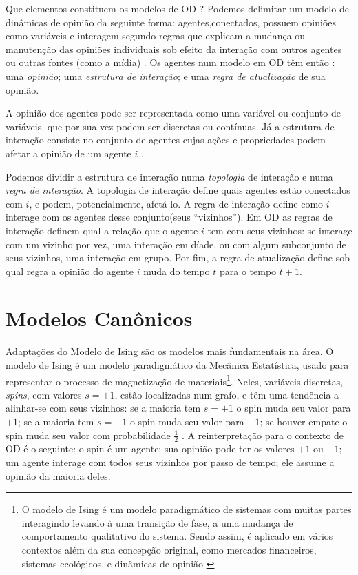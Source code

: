   Que elementos constituem os modelos de OD ? Podemos delimitar um modelo de
  dinâmicas de opinião da seguinte forma: agentes,conectados, possuem opiniões
  como variáveis e interagem segundo regras que explicam a mudança ou manutenção
  das opiniões individuais sob efeito da interação com outros agentes ou outras
  fontes (como a mídia) \cite{sirbu2017opinion}. Os agentes num modelo em OD têm
  então : uma \textit{opinião}; uma \textit{estrutura de interação}; e uma
  \textit{regra de atualização} de sua opinião.


  A opinião dos agentes pode ser representada como uma variável ou conjunto de
  variáveis, que por sua vez podem ser discretas ou contínuas. Já a estrutura de
  interação consiste no conjunto de agentes cujas ações e propriedades podem
  afetar a opinião de um agente \(i\) \cite{page2008uncertainty}.

  Podemos dividir a estrutura de interação numa \textit{topologia} de interação e
  numa \textit{regra de interação}. A topologia de interação define quais
  agentes estão conectados com \(i\), e podem, potencialmente, afetá-lo. A regra
  de interação define como \(i\) interage com os agentes desse conjunto(seus
  ``vizinhos''). Em OD as regras de interação definem qual a
  relação que o agente \(i\) tem com seus vizinhos: se interage com um vizinho
  por vez, uma interação em díade, ou com algum subconjunto de seus vizinhos,
  uma interação em grupo. Por fim, a regra de atualização define sob qual regra
  a opinião do agente \(i\) muda do tempo \(t\) para o tempo \(t+1\). 

  

  \section{Modelos Canônicos}

  Adaptações do Modelo de Ising são os modelos mais fundamentais na área. O
  modelo de Ising é um modelo paradigmático da Mecânica Estatística, usado para
  representar o processo de magnetização de materiais\footnote{O modelo de Ising
    é um modelo paradigmático de sistemas com muitas partes interagindo levando
    à uma transição de fase, a uma mudança de comportamento qualitativo do
    sistema. Sendo assim, é aplicado em vários contextos além da sua concepção
    original, como mercados financeiros, sistemas ecológicos, e dinâmicas de
    opinião \cite{sole2011phase}}. Neles, variáveis discretas, \textit{spins},
  com valores $s = \pm 1$, estão localizadas num grafo, e têm uma tendência a
  alinhar-se com seus vizinhos: se a maioria tem \(s = + 1 \) o spin muda seu
  valor para \(+1\); se a maioria tem \(s = -1 \) o spin muda seu valor para
  \(-1\); se houver empate o spin muda seu valor com probabilidade
  \(\frac{1}{2}\) \cite{castellano2012social,sole2011phase}. A reinterpretação
  para o contexto de OD é o seguinte: o spin é um agente; sua opinião pode ter
  os valores \(+1\) ou \(-1\); um agente interage com todos seus vizinhos por
  passo de tempo; ele assume a opinião da maioria deles.

